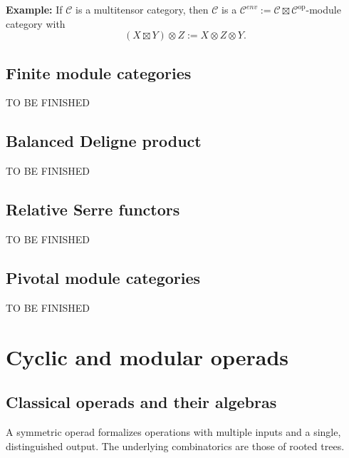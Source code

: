 \documentclass[11pt]{article}
\theoremstyle{definition}
\begin{document}
\textbf{Example:} If \( \mathcal{C} \) is a multitensor category, then \( \mathcal{C} \) is a \( \mathcal{C}^{env}:= \mathcal{C} \boxtimes \mathcal{C}^{\mathrm{op}} \)-module category with
\[ (X \boxtimes Y) \otimes Z := X \otimes Z \otimes Y. \]






\subsection{Finite module categories}

{\color{red} TO BE FINISHED }

\subsection{Balanced Deligne product}

{\color{red} TO BE FINISHED }




\subsection{Relative Serre functors}

{\color{red} TO BE FINISHED }


\subsection{Pivotal module categories}


{\color{red} TO BE FINISHED }






\section{Cyclic and modular operads}





\subsection{Classical operads and their algebras}

A symmetric operad formalizes operations with multiple inputs and a single, distinguished output. The underlying combinatorics are those of rooted trees.
\end{document}
